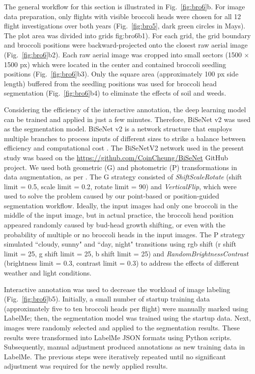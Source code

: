 The general workflow for this section is illustrated in Fig.~\ref{fig:bro6}b. For image data preparation, only flights with visible broccoli heads were chosen for all 12 flight investigations over both years (Fig.~\ref{fig:bro5}, dark green circles in Mays). The plot area was divided into grids {fig:bro6}b1). For each grid, the grid boundary and broccoli positions were backward-projected onto the closest raw aerial image (Fig.~\ref{fig:bro6}b2). Each raw aerial image was cropped into small sectors (1500 $\times$ 1500 px) which were located in the center and contained broccoli seedling positions (Fig.~\ref{fig:bro6}b3). Only the square area (approximately 100 px side length) buffered from the seedling positions was used for broccoli head segmentation (Fig.~\ref{fig:bro6}b4) to eliminate the effects of soil and weeds.

Considering the efficiency of the interactive annotation, the deep learning model can be trained and applied in just a few minutes. Therefore, BiSeNet v2 \citep{yu_bisenet_2020} was used as the segmentation model. BiSeNet v2 is a network structure that employs multiple branches to process inputs of different sizes to strike a balance between efficiency and computational cost \citep[Fig.~1]{yu_bisenet_2020}. The BiSeNetV2 network used in the present study was based on the \url{https://github.com/CoinCheung/BiSeNet} GitHub project. We used both geometric (G) and photometric (P) transformations in data augmentation, as per \citet{blok_effect_2021}. The G strategy consisted of \textit{ShiftScaleRotate} (shift limit = 0.5, scale limit = 0.2, rotate limit = 90) and \textit{VerticalFlip}, which were used to solve the problem caused by our point-based or position-guided segmentation workflow. Ideally, the input images had only one broccoli in the middle of the input image, but in actual practice, the broccoli head position appeared randomly caused by bud-head growth shifting, or even with the probability of multiple or no broccoli heads in the input images. The P strategy simulated ``cloudy, sunny" and ``day, night" transitions using \gls{rgb} shift (r shift limit = 25, g shift limit = 25, b shift limit = 25) and \textit{RandomBrightnessContrast} (brightness limit = 0.3, contrast limit = 0.3) to address the effects of different weather and light conditions.

Interactive annotation was used to decrease the workload of image labeling \linebreak (Fig.~\ref{fig:bro6}b5). Initially, a small number of startup training data (approximately five to ten broccoli heads per flight) were manually marked using LabelMe; then, the segmentation model was trained using the startup data. Next, images were randomly selected and applied to the segmentation results. These results were transformed into LabelMe JSON formats using Python scripts. Subsequently, manual adjustment produced annotations as new training data in LabelMe. The previous steps were iteratively repeated until no significant adjustment was required for the newly applied results.

